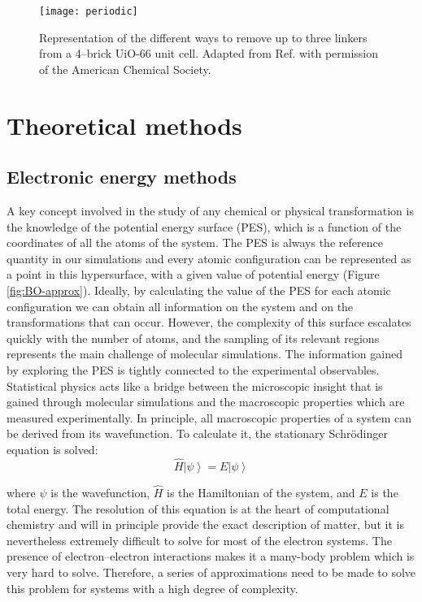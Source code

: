 \begin{figure}[!htbp]
	\centering
 	\texttt{[image: periodic]}
	\caption{Representation of the different ways to remove up to three linkers from a 4--brick UiO-66 unit cell. Adapted from Ref. \cite{marreiros2019active} with permission of the American Chemical Society.}
	\label{fig:periodic}
\end{figure}

\section{Theoretical methods}
\subsection*{Electronic energy methods}
A key concept involved in the study of any chemical or physical transformation is the knowledge of the potential energy surface (PES), which is a function of the coordinates of all the atoms of the system. The PES is always the reference quantity in our simulations and every atomic configuration can be represented as a point in this hypersurface, with a given value of potential energy (Figure \ref{fig:BO-approx}).
\npar
Ideally, by calculating the value of the PES for each atomic configuration we can obtain all information on the system and on the transformations that can occur. However, the complexity of this surface escalates quickly with the number of atoms, and the sampling of its relevant regions represents the main challenge of molecular simulations. The information gained by exploring the PES is tightly connected to the experimental observables. Statistical physics acts like a bridge between the microscopic insight that is gained through molecular simulations and the macroscopic properties which are measured experimentally. In principle, all macroscopic properties of a system can be derived from its wavefunction. To calculate it, the stationary Schr\"{o}dinger equation is solved: 
\[
\hat{H}\left\vert\psi\right\rangle = E\left\vert\psi\right\rangle
\]

where $\psi$ is the wavefunction, $\hat{H}$ is the Hamiltonian of the system, and $E$ is the total energy. The resolution of this equation is at the heart of computational chemistry and will in principle provide the exact description of matter, but it is nevertheless extremely difficult to solve for most of the electron systems. The presence of electron--electron interactions makes it a many-body problem which is very hard to solve. Therefore, a series of approximations need to be made to solve this problem for systems with a high degree of complexity.  

